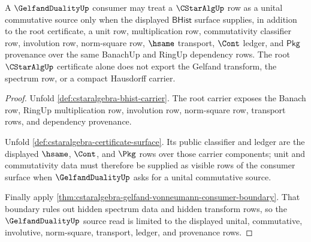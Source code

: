\begin{theorem}
\label{thm:cstaralgebra-unital-commutative-source-boundary}
A $\GelfandDualityUp$ consumer may treat a $\CStarAlgUp$ row as a unital
commutative source only when the displayed $\mathsf{BHist}$ surface supplies,
in addition to the root certificate, a unit row, multiplication row,
commutativity classifier row, involution row, norm-square row, $\hsame$
transport, $\Cont$ ledger, and $\mathsf{Pkg}$ provenance over the same
BanachUp and RingUp dependency rows. The root $\CStarAlgUp$ certificate alone
does not export the Gelfand transform, the spectrum row, or a compact
Hausdorff carrier.
\end{theorem}
\begin{proof}
Unfold \autoref{def:cstaralgebra-bhist-carrier}. The root carrier exposes the
Banach row, RingUp multiplication row, involution row, norm-square row,
transport rows, and dependency provenance.

Unfold \autoref{def:cstaralgebra-certificate-surface}. Its public classifier
and ledger are the displayed $\hsame$, $\Cont$, and $\Pkg$ rows over those
carrier components; unit and commutativity data must therefore be supplied as
visible rows of the consumer surface when $\GelfandDualityUp$ asks for a
unital commutative source.

Finally apply
\autoref{thm:cstaralgebra-gelfand-vonneumann-consumer-boundary}. That boundary
rules out hidden spectrum data and hidden transform rows, so the
$\GelfandDualityUp$ source read is limited to the displayed unital,
commutative, involutive, norm-square, transport, ledger, and provenance rows.
\end{proof}

